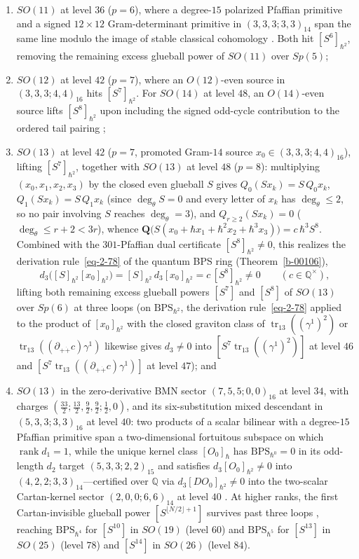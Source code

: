 \documentclass[11pt]{article}
\numberwithin{equation}{section}
\numberwithin{figure}{section}
\numberwithin{table}{section}
\begin{document}
\begin{enumerate}
\item $SO(11)$ at level $36$ ($p=6$), where a degree-$15$ polarized Pfaffian primitive and a signed $12\times12$ Gram-determinant primitive in $(3,3,3;3,3)_{14}$ span the same line modulo the image of stable classical cohomology \cite{Repo}. Both hit $[S^6]_{\hbar^2}$, removing the remaining excess glueball power of $SO(11)$ over $Sp(5)$;
\item $SO(12)$ at level $42$ ($p=7$), where an $O(12)$-even source in $(3,3,3;4,4)_{16}$ hits $[S^7]_{\hbar^2}$. For $SO(14)$ at level $48$, an $O(14)$-even source lifts $[S^8]_{\hbar^2}$ upon including the signed odd-cycle contribution to the ordered tail pairing \cite{Repo};
\item $SO(13)$ at level $42$ ($p=7$, promoted Gram-$14$ source $x_0\in(3,3,3;4,4)_{16}$), lifting $[S^7]_{\hbar^2}$, together with $SO(13)$ at level $48$ ($p=8$): multiplying $(x_0,x_1,x_2,x_3)$ by the closed even glueball $S$ gives $Q_0(Sx_k)=S\,Q_0x_k$, $Q_1(Sx_k)=S\,Q_1x_k$ (since $\deg_\theta S=0$ and every letter of $x_k$ has $\deg_\theta\le2$, so no pair involving $S$ reaches $\deg_\theta=3$), and $Q_{r\ge2}(Sx_k)=0$ ($\deg_\theta\le r+2<3r$), whence $\mathbf Q\bigl(S(x_0+\hbar x_1+\hbar^2x_2+\hbar^3x_3)\bigr)=c\,\hbar^3S^8$. Combined with the $301$-Pfaffian dual certificate $[S^8]_{\hbar^2}\ne0$, this realizes the derivation rule~\eqref{eq-2-78} of the quantum BPS ring (Theorem~\ref{b-00106}),
\begin{equation}\label{eq-so13-s8-product-lift}
d_3\bigl([S]_{\hbar^2}[x_0]_{\hbar^2}\bigr)
=[S]_{\hbar^2}\,d_3[x_0]_{\hbar^2}
=c\,[S^8]_{\hbar^2}\ne0\qquad(c\in\mathbb Q^\times),
\end{equation}
lifting both remaining excess glueball powers $[S^7]$ and $[S^8]$ of $SO(13)$ over $Sp(6)$ at three loops (on $\mathrm{BPS}_{\hbar^2}$, the derivation rule~\eqref{eq-2-78} applied to the product of $[x_0]_{\hbar^2}$ with the closed graviton class of $\operatorname{tr}_{13}((\gamma^1)^2)$ or $\operatorname{tr}_{13}((\partial_{+\dot+}c)\gamma^1)$ likewise gives $d_3\ne0$ into $[S^7\operatorname{tr}_{13}((\gamma^1)^2)]$ at level $46$ and $[S^7\operatorname{tr}_{13}((\partial_{+\dot+}c)\gamma^1)]$ at level $47$); and
\item $SO(13)$ in the zero-derivative BMN sector $(7,5,5;0,0)_{16}$ at level $34$, with charges $(\tfrac{33}2;\tfrac{13}2,\tfrac92,\tfrac92;\tfrac12,0)$, and its six-substitution mixed descendant in $(5,3,3;3,3)_{16}$ at level $40$: two products of a scalar bilinear with a degree-$15$ Pfaffian primitive span a two-dimensional fortuitous subspace on which $\operatorname{rank}d_1=1$, while the unique kernel class $[O_0]_{\hbar}$ has $\mathrm{BPS}_{\hbar^0}=0$ in its odd-length $d_2$ target $(5,3,3;2,2)_{15}$ and satisfies $d_3[O_0]_{\hbar^2}\ne0$ into $(4,2,2;3,3)_{14}$---certified over $\mathbb Q$ via $d_3[DO_0]_{\hbar^2}\ne0$ into the two-scalar Cartan-kernel sector $(2,0,0;6,6)_{14}$ at level $40$ \cite{Repo}. At higher ranks, the first Cartan-invisible glueball power $[S^{\lfloor N/2\rfloor+1}]$ survives past three loops \cite{Repo}, reaching $\mathrm{BPS}_{\hbar^4}$ for $[S^{10}]$ in $SO(19)$ (level $60$) and $\mathrm{BPS}_{\hbar^5}$ for $[S^{13}]$ in $SO(25)$ (level $78$) and $[S^{14}]$ in $SO(26)$ (level $84$).

\end{enumerate}
\end{document}
